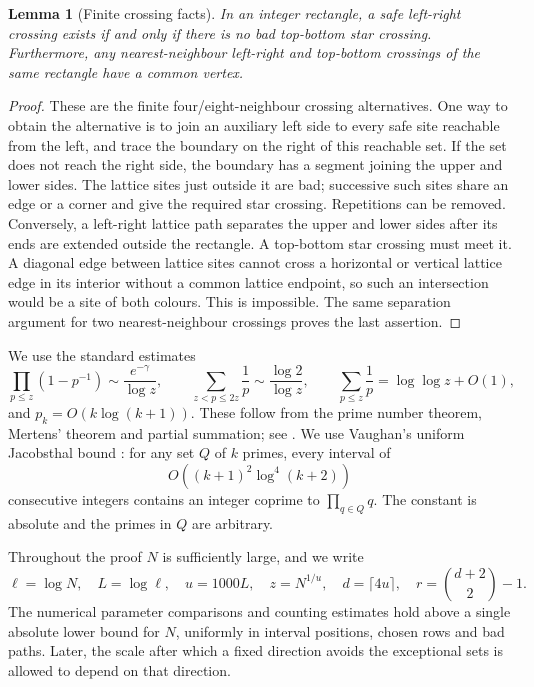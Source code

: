 \documentclass[11pt]{article}
\newtheorem{lemma}[theorem]{Lemma}
\theoremstyle{definition}
\theoremstyle{remark}
\begin{document}
\begin{lemma}[Finite crossing facts]\label{lem:planar}
In an integer rectangle, a safe left-right crossing exists if and only if
there is no bad top-bottom star crossing. Furthermore, any nearest-neighbour
left-right and top-bottom crossings of the same rectangle have a common
vertex.
\end{lemma}
\begin{proof}
These are the finite four/eight-neighbour crossing alternatives. One way
to obtain the alternative is to join an auxiliary left side to every
safe site reachable from the left, and trace the boundary on the right of
this reachable set. If the set does not reach the right side, the boundary
has a segment joining the upper and lower sides. The lattice sites just
outside it are bad; successive such sites share an edge or a corner and
give the required star crossing. Repetitions can be removed. Conversely,
a left-right lattice path separates the upper and lower sides after its
ends are extended outside the rectangle. A top-bottom star crossing must
meet it. A diagonal edge between lattice sites cannot cross a horizontal
or vertical lattice edge in its interior without a common lattice endpoint,
so such an intersection would be a site of both colours. This is impossible.
The same separation argument for two nearest-neighbour crossings proves
the last assertion.
\end{proof}

We use the standard estimates
\begin{equation}\label{eq:prime-estimates}
 \prod_{p\leq z}(1-p^{-1})\sim\frac{e^{-\gamma}}{\log z},\qquad
 \sum_{z<p\leq2z}\frac1p\sim\frac{\log2}{\log z},\qquad
 \sum_{p\leq z}\frac1p=\log\log z+O(1),
\end{equation}
and $p_k=O(k\log(k+1))$. These follow from the prime number theorem,
Mertens' theorem and partial summation; see \cite{RosserSchoenfeld1962}.
We use Vaughan's uniform Jacobsthal bound \cite[p.~329]{Vaughan1977}:
for any set $Q$ of $k$ primes, every interval of
\begin{equation}\label{eq:jacobsthal}
                         O((k+1)^2\log^4(k+2))
\end{equation}
consecutive integers contains an integer coprime to $\prod_{q\in Q}q$.
The constant is absolute and the primes in $Q$ are arbitrary.

Throughout the proof $N$ is sufficiently large, and we write
\begin{equation}\label{eq:parameters}
 \ell=\log N,\quad L=\log\ell,\quad u=1000L,\quad z=N^{1/u},\quad
 d=\lceil4u\rceil,\quad r=\binom{d+2}{2}-1.
\end{equation}
The numerical parameter comparisons and counting estimates hold above a
single absolute lower bound for $N$, uniformly in interval positions,
chosen rows and bad paths. Later, the scale after which a fixed direction
avoids the exceptional sets is allowed to depend on that direction.
\end{document}
